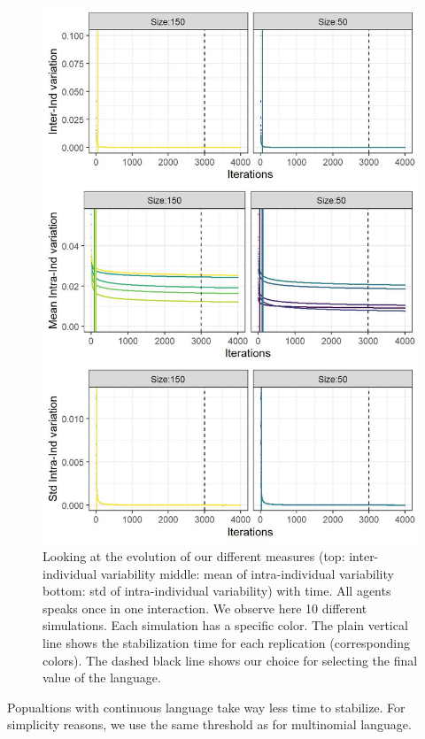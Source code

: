 \documentclass[
]{article}
\begin{document}
\begin{figure}[!H]

{\centering \includegraphics{./Figures/print timeline2-1} 

}

\caption{Looking at the evolution of our different measures (top: inter-individual variability middle: mean of intra-individual variability bottom: std of intra-individual variability) with time. All agents speaks once in one interaction. We observe here 10 different simulations. Each simulation has a specific color. The plain vertical line shows the stabilization time for each replication (corresponding colors). The dashed black line shows our choice for selecting the final value of the language.}\label{fig:print timeline2}
\end{figure}

Popualtions with continuous language take way less time to stabilize.
For simplicity reasons, we use the same threshold as for multinomial
language.
\end{document}
